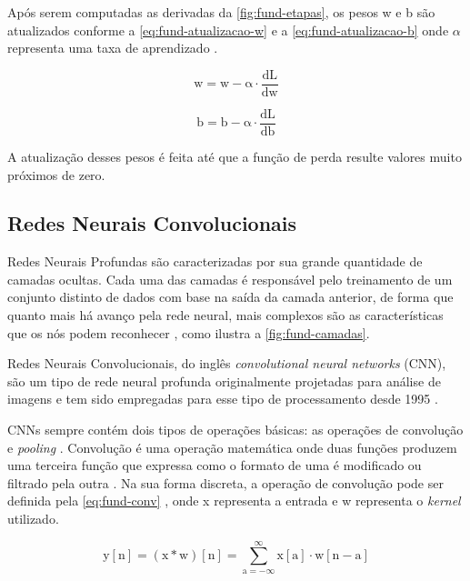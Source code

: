 Após serem computadas as derivadas da \autoref{fig:fund-etapas}, os pesos w e b são atualizados conforme a \autoref{eq:fund-atualizacao-w} e a \autoref{eq:fund-atualizacao-b} onde $\alpha$ representa uma taxa de aprendizado \cite{ref:Ng}.

\begin{equation} \label{eq:fund-atualizacao-w}
  \mathrm{
    w = w - \alpha \cdot \frac{dL}{dw}
  }
\end{equation}

\begin{equation} \label{eq:fund-atualizacao-b}
  \mathrm{
    b = b - \alpha \cdot \frac{dL}{db}
  }
\end{equation}

A atualização desses pesos é feita até que a função de perda resulte valores muito próximos de zero.

\subsection{Redes Neurais Convolucionais} \label{cap:fund-ia-rn-prof}
Redes Neurais Profundas são caracterizadas por sua grande quantidade de camadas ocultas. Cada uma das camadas é responsável pelo treinamento de um conjunto distinto de dados com base na saída da camada anterior, de forma que quanto mais há avanço pela rede neural, mais complexos são as características que os nós podem reconhecer \cite{ref:Nicholson}, como ilustra a \autoref{fig:fund-camadas}.

Redes Neurais Convolucionais, do inglês \textit{convolutional neural networks} (CNN), são um tipo de rede neural profunda originalmente projetadas para análise de imagens \cite{ref:Eden-Ierapetritou-Towler} e tem sido empregadas para esse tipo de processamento desde 1995 \cite{ref:Yan}.

CNNs sempre contém dois tipos de operações básicas: as operações de convolução e \textit{pooling} \cite{ref:Eden-Ierapetritou-Towler}. Convolução é uma operação matemática onde duas funções produzem uma terceira função que expressa como o formato de uma é modificado ou filtrado pela outra \cite{ref:Yan}. Na sua forma discreta, a operação de convolução pode ser definida pela \autoref{eq:fund-conv} \cite{ref:Goodfellow-Bengio-Courville}, onde x representa a entrada e w representa o \textit{kernel} utilizado.

\begin{equation} \label{eq:fund-conv}
\mathrm{
  y[n] = (x \ast w)[n] = \sum_{a = -\infty}^{\infty} x[a] \cdot w [n - a]
}
\end{equation}

